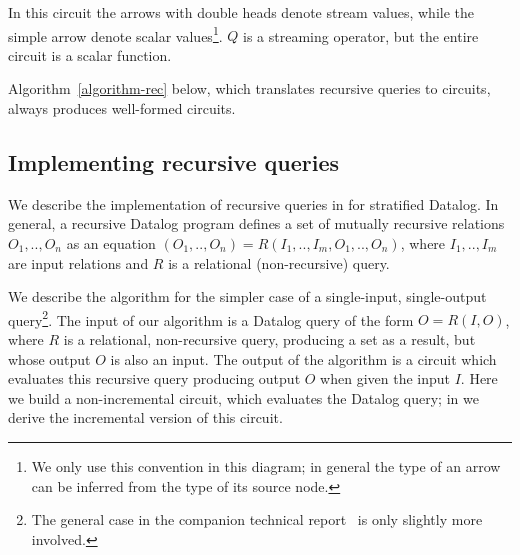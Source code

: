 In this circuit the arrows with double
heads denote stream values, while the simple arrow denote scalar values\footnote{We only use this convention in this diagram;
in general the type of an arrow can be inferred from the type
of its source node.}.  $Q$ is a streaming operator, but the entire circuit is a scalar function.

Algorithm~\ref{algorithm-rec} below, which translates recursive queries to
\dbsp circuits, always produces well-formed circuits.

\subsection{Implementing recursive queries}\label{sec:datalog}

We describe the implementation of recursive queries in \dbsp for
stratified Datalog.
In general, a recursive Datalog program defines a set of
mutually recursive relations $O_1,..,O_n$ as an equation
$(O_1,..,O_n)=R(I_1,..,I_m, O_1,..,O_n)$, where $I_1,..,I_m$ are
input relations and $R$ is a relational (non-recursive) query.

We describe the algorithm for
the simpler case of a single-input, single-output query\footnote{The general case
in the companion technical report~ is only
slightly more involved.}.  The input of our algorithm is a Datalog query of the form
$O = R(I, O)$, where $R$ is a relational, non-recursive query,
producing a set as a result, but whose output $O$ is also an input.
The output of the algorithm is a \dbsp circuit which evaluates this
recursive query producing output $O$ when given the input $I$.  Here we build
a non-incremental circuit, which evaluates the Datalog query;
in  we derive the incremental version
of this circuit.

